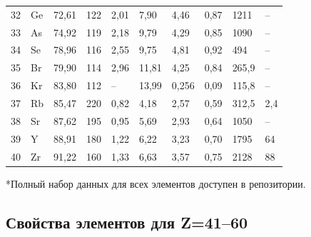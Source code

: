 \documentclass[12pt,a4paper]{article}
\begin{document}
\begin{longtable}{p{0.6cm}p{1.2cm}p{1.2cm}p{1.2cm}p{1.2cm}p{1.2cm}p{1.5cm}p{1.2cm}p{1.2cm}p{1.2cm}}
		32 & Ge & 72,61 & 122 & 2,01 & 7,90 & 4,46 & 0,87 & 1211 & – \\
		33 & As & 74,92 & 119 & 2,18 & 9,79 & 4,29 & 0,85 & 1090 & – \\
		34 & Se & 78,96 & 116 & 2,55 & 9,75 & 4,81 & 0,92 & 494 & – \\
		35 & Br & 79,90 & 114 & 2,96 & 11,81 & 4,25 & 0,84 & 265,9 & – \\
		36 & Kr & 83,80 & 112 & –    & 13,99 & 0,256 & 0,09 & 115,8 & – \\
		37 & Rb & 85,47 & 220 & 0,82 & 4,18 & 2,57 & 0,59 & 312,5 & 2,4 \\
		38 & Sr & 87,62 & 195 & 0,95 & 5,69 & 2,93 & 0,64 & 1050 & – \\
		39 & Y  & 88,91 & 180 & 1,22 & 6,22 & 3,23 & 0,70 & 1795 & 64 \\
		40 & Zr & 91,22 & 160 & 1,33 & 6,63 & 3,57 & 0,75 & 2128 & 88 \\
		\bottomrule
	\end{longtable}
	*Полный набор данных для всех элементов доступен в репозитории.
	
	\subsection*{Свойства элементов для Z=41–60}
	
\end{document}
